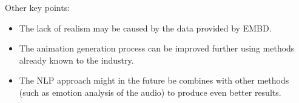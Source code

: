 \noindent Other key points:
\begin{itemize}
	\item The lack of realism may be caused by the data provided by EMBD.
	\item The animation generation process can be improved further using methods already known to the industry.
	\item The NLP approach might in the future be combines with other methods (such as emotion analysis of the audio) to produce even better results.
\end{itemize}




